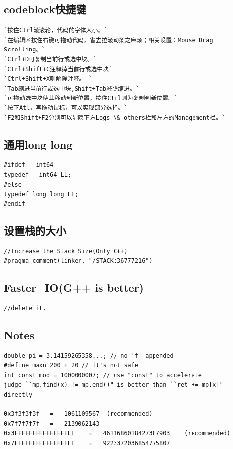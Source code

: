 \documentclass[a4paper]{article}
\begin{document}
\begin{CJK*}{UTF8}{gbsn}
\begin{multicols}{3}
\begin{flushleft}
\subsection{codeblock快捷键}
\begin{lstlisting}
`按住Ctrl滚滚轮，代码的字体大小。`
`在编辑区按住右键可拖动代码，省去拉滚动条之麻烦；相关设置：Mouse Drag Scrolling。` 
`Ctrl+D可复制当前行或选中块。`
`Ctrl+Shift+C注释掉当前行或选中块`
`Ctrl+Shift+X则解除注释。 `
`Tab缩进当前行或选中块,Shift+Tab减少缩进。`
`可拖动选中块使其移动到新位置，按住Ctrl则为复制到新位置。`
`按下Atl，再拖动鼠标，可以实现部分选择。`
`F2和Shift+F2分别可以显隐下方Logs \& others栏和左方的Management栏。`
\end{lstlisting}

\subsection{通用long long}
\begin{lstlisting}
#ifdef __int64
typedef __int64 LL;
#else
typedef long long LL;
#endif
\end{lstlisting}

\subsection{设置栈的大小}
\begin{lstlisting}
//Increase the Stack Size(Only C++)
#pragma comment(linker, "/STACK:36777216")
\end{lstlisting}

\subsection{Faster\_IO(G++ is better)}
\begin{lstlisting}
//delete it.
\end{lstlisting}


\subsection{Notes}
\begin{lstlisting}
double pi = 3.14159265358...; // no 'f' appended
#define maxn 200 + 20 // it's not safe
int const mod = 1000000007; // use "const" to accelerate
judge ``mp.find(x) != mp.end()" is better than ``ret += mp[x]" directly

0x3f3f3f3f   =   1061109567  (recommended)
0x7f7f7f7f   =   2139062143
0x3FFFFFFFFFFFFFFFLL    =   4611686018427387903    (recommended)
0x7FFFFFFFFFFFFFFFLL    =   9223372036854775807


\end{lstlisting}
\end{flushleft}
\end{multicols}
\end{CJK*}
\end{document}
